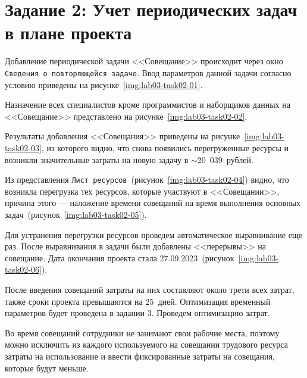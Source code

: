 \section{Задание 2: Учет периодических задач в плане проекта}

Добавление периодической задачи <<Совещание>> происходит через окно
\texttt{Сведения о повторяющейся задаче}. Ввод параметров данной задачи согласно
условию приведены на рисунке~\ref{img:lab03-task02-01}.


Назначение всех специалистов кроме программистов и наборщиков данных на
<<Совещание>> представлено на рисунке~\ref{img:lab03-task02-02}.


Результаты добавления <<Совещания>> приведены на
рисунке~\ref{img:lab03-task02-03}, из которого видно, что снова появились
перегруженные ресурсы и возникли значительные затраты на новую задачу в
$\sim$20~039~рублей.


Из представления \texttt{Лист ресурсов}~(рисунок~\ref{img:lab03-task02-04})
видно, что возникла перегрузка тех ресурсов, которые участвуют в <<Совещании>>,
причина этого --- наложение времени совещаний на время выполнения основных
задач~(рисунок~\ref{img:lab03-task02-05}).



Для устранения перегрузки ресурсов проведем автоматическое выравнивание еще
раз.  После выравнивания в задачи были добавлены <<перерывы>> на совещание.
Дата окончания проекта стала 27.09.2023~(рисунок~\ref{img:lab03-task02-06}).


После введения совещаний затраты на них составляют около трети всех затрат,
также сроки проекта превышаются на 25~дней. Оптимизация временный параметров
будет проведена в задании 3. Проведем оптимизацию затрат.

Во время совещаний сотрудники не занимают свои рабочие места, поэтому можно
исключить из каждого используемого на совещании трудового ресурса затраты на
использование и ввести фиксированные затраты на совещания, которые будут
меньше.


